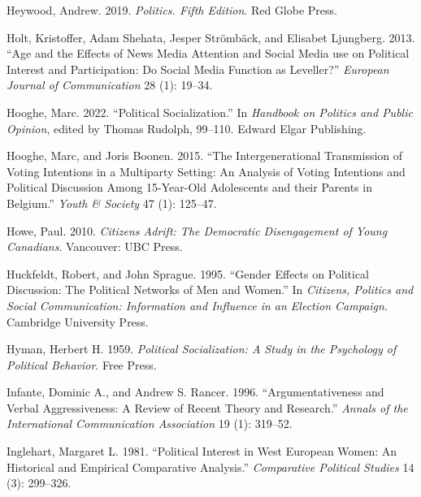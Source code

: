 \documentclass[
  letterpaper,
  DIV=11,
  numbers=noendperiod]{scrreprt}
\newlength{\cslhangindent}
\newlength{\cslentryspacingunit} %
\newenvironment{CSLReferences}[2] %
 {%
  \setlength{\parindent}{0pt}
  \ifodd #1
  \let\oldpar\par
  \def\par{\hangindent=\cslhangindent\oldpar}
  \fi
  \setlength{\parskip}{#2\cslentryspacingunit}
 }%
 {}
\begin{document}
\begin{CSLReferences}{1}{0}
\leavevmode{}%
Heywood, Andrew. 2019. \emph{{Politics. Fifth Edition}}. Red Globe
Press.

\leavevmode{}%
Holt, Kristoffer, Adam Shehata, Jesper Strömbäck, and Elisabet
Ljungberg. 2013. {``{Age and the Effects of News Media Attention and
Social Media use on Political Interest and Participation: Do Social
Media Function as Leveller?}''} \emph{European Journal of Communication}
28 (1): 19--34.

\leavevmode{}%
Hooghe, Marc. 2022. {``{Political Socialization}.''} In \emph{Handbook
on Politics and Public Opinion}, edited by Thomas Rudolph, 99--110.
Edward Elgar Publishing.

\leavevmode{}%
Hooghe, Marc, and Joris Boonen. 2015. {``{The Intergenerational
Transmission of Voting Intentions in a Multiparty Setting: An Analysis
of Voting Intentions and Political Discussion Among 15-Year-Old
Adolescents and their Parents in Belgium}.''} \emph{Youth \& Society} 47
(1): 125--47.

\leavevmode{}%
Howe, Paul. 2010. \emph{{Citizens Adrift: The Democratic Disengagement
of Young Canadians}}. Vancouver: UBC Press.

\leavevmode{}%
Huckfeldt, Robert, and John Sprague. 1995. {``{Gender Effects on
Political Discussion: The Political Networks of Men and Women}.''} In
\emph{{Citizens, Politics and Social Communication: Information and
Influence in an Election Campaign}}. Cambridge University Press.

\leavevmode{}%
Hyman, Herbert H. 1959. \emph{{Political Socialization: A Study in the
Psychology of Political Behavior}}. Free Press.

\leavevmode{}%
Infante, Dominic A., and Andrew S. Rancer. 1996. {``{Argumentativeness
and Verbal Aggressiveness: A Review of Recent Theory and Research}.''}
\emph{Annals of the International Communication Association} 19 (1):
319--52.

\leavevmode{}%
Inglehart, Margaret L. 1981. {``{Political Interest in West European
Women: An Historical and Empirical Comparative Analysis}.''}
\emph{Comparative Political Studies} 14 (3): 299--326.


\end{CSLReferences}
\end{document}
